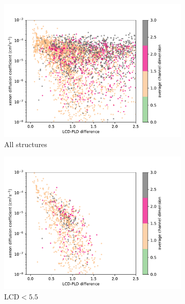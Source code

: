 \documentclass[main]{subfiles}
\begin{document}
\begin{figure}[ht]
  \centering
  \begin{subfigure}[b]{0.32\textwidth}
      \centering
      \includegraphics[width=\textwidth]{figures/5-diffusion/D_xe-poresize-chandim_all.pdf}
      \caption{All structures}\label{fgr:porediff_a}
  \end{subfigure}
  \hfill
  \begin{subfigure}[b]{0.32\textwidth}
      \centering
      \includegraphics[width=\textwidth]{figures/5-diffusion/D_xe-poresize-chandim_LCDunder.pdf}
      \caption{LCD$<5.5$}\label{fgr:porediff_b}
  \end{subfigure}
  \hfill
  \begin{subfigure}[b]{0.32\textwidth}

\end{subfigure}
\end{figure}
\end{document}
